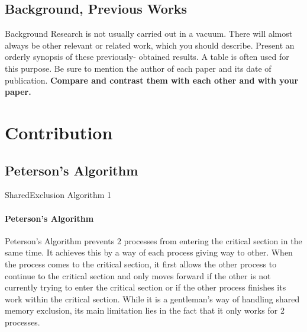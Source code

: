 \documentclass[11pt]{beamer}              %
\begin{document}

\subsection{Background, Previous Works}
\begin{frame}{Background}
Research is not usually carried out in a vacuum. There will almost always be other relevant or related work, which you should describe. Present an orderly synopsis of these previously- obtained results. A table is often used for this purpose. Be sure to mention the author of each paper and its date of publication. \textbf{Compare and contrast them with each other and with your paper.}
\end{frame}


\section{Contribution}
\subsection{Peterson's Algorithm}
\begin{frame}{SharedExclusion Algorithm 1}
\framesubtitle{Peterson's Algorithm}
Peterson's Algorithm \cite{Peterson_1981} prevents 2 processes from entering the critical section in the same time. It achieves this by a way of each process giving way to other. When the process comes to the critical section, it first allows the other process to continue to the critical section and only moves forward if the other is not currently trying to enter the critical section or if the other process finishes its work within the critical section. While it is a gentleman's way of handling shared memory exclusion, its main limitation lies in the fact that it only works for 2 processes.
\end{frame}
\end{document}
